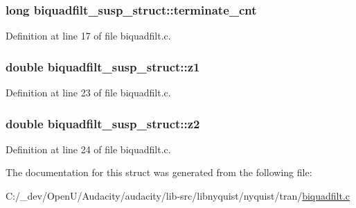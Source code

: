 \subsubsection[{\texorpdfstring{terminate\+\_\+cnt}{terminate_cnt}}]{\setlength{\rightskip}{0pt plus 5cm}long biquadfilt\+\_\+susp\+\_\+struct\+::terminate\+\_\+cnt}\hypertarget{structbiquadfilt__susp__struct_ae5b5974688ea0dec10f3553f2e6cfdde}{}\label{structbiquadfilt__susp__struct_ae5b5974688ea0dec10f3553f2e6cfdde}


Definition at line 17 of file biquadfilt.\+c.

\subsubsection[{\texorpdfstring{z1}{z1}}]{\setlength{\rightskip}{0pt plus 5cm}double biquadfilt\+\_\+susp\+\_\+struct\+::z1}\hypertarget{structbiquadfilt__susp__struct_a74984c84c74be85a0b7c24c07902a5e7}{}\label{structbiquadfilt__susp__struct_a74984c84c74be85a0b7c24c07902a5e7}


Definition at line 23 of file biquadfilt.\+c.

\subsubsection[{\texorpdfstring{z2}{z2}}]{\setlength{\rightskip}{0pt plus 5cm}double biquadfilt\+\_\+susp\+\_\+struct\+::z2}\hypertarget{structbiquadfilt__susp__struct_a266bbc5b9e0bf7f1359267cb7d07db25}{}\label{structbiquadfilt__susp__struct_a266bbc5b9e0bf7f1359267cb7d07db25}


Definition at line 24 of file biquadfilt.\+c.



The documentation for this struct was generated from the following file\+:\begin{DoxyCompactItemize}
\item 
C\+:/\+\_\+dev/\+Open\+U/\+Audacity/audacity/lib-\/src/libnyquist/nyquist/tran/\hyperlink{biquadfilt_8c}{biquadfilt.\+c}\end{DoxyCompactItemize}
